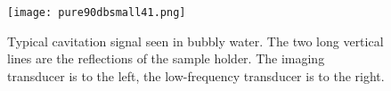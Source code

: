 \begin{figure}[h]
     \centering
          \texttt{[image: pure90dbsmall41.png]}
     \caption{Typical cavitation signal seen in bubbly water.
     The two long vertical lines are the reflections of the sample
     holder.
     The imaging transducer is to the left,
     the low-frequency transducer is to the right.}
   \label{fig:cavitation}
\end{figure}




